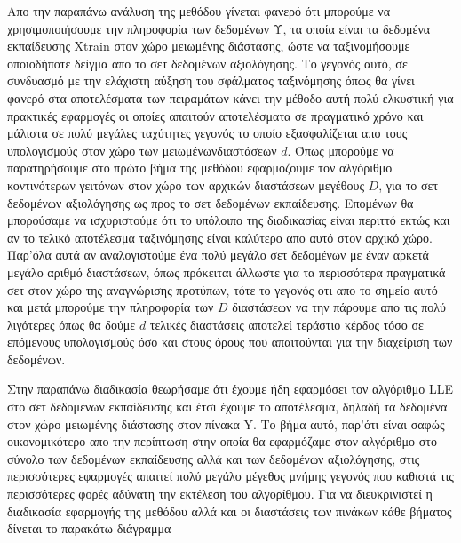 \par
Απο την παραπάνω ανάλυση της μεθόδου γίνεται φανερό ότι μπορούμε να χρησιμοποιήσουμε την πληροφορία των δεδομένων Υ, τα οποία είναι τα δεδομένα εκπαίδευσης \textlatin{Xtrain} στον χώρο μειωμένης διάστασης, ώστε να ταξινομήσουμε οποιοδήποτε δείγμα απο το σετ δεδομένων αξιολόγησης. Το γεγονός αυτό, σε συνδυασμό με την ελάχιστη αύξηση του σφάλματος ταξινόμησης όπως θα γίνει φανερό στα αποτελέσματα των πειραμάτων κάνει την μέθοδο αυτή πολύ ελκυστική για πρακτικές εφαρμογές οι οποίες απαιτούν αποτελέσματα σε πραγματικό χρόνο και μάλιστα σε πολύ μεγάλες ταχύτητες γεγονός το οποίο εξασφαλίζεται απο τους υπολογισμούς στον χώρο των μειωμένωνδιαστάσεων $d$. Όπως μπορούμε να παρατηρήσουμε στο πρώτο βήμα της μεθόδου εφαρμόζουμε τον αλγόριθμο κοντινότερων γειτόνων στον χώρο των αρχικών διαστάσεων μεγέθους $D$, για το σετ δεδομένων αξιολόγησης ως προς το σετ δεδομένων εκπαίδευσης. Επομένων θα μπορούσαμε να ισχυριστούμε ότι το υπόλοιπο της διαδικασίας είναι περιττό εκτώς και αν το τελικό αποτέλεσμα ταξινόμησης είναι καλύτερο απο αυτό στον αρχικό χώρο. Παρ'όλα αυτά αν αναλογιστούμε ένα πολύ μεγάλο σετ δεδομένων με έναν αρκετά μεγάλο αριθμό διαστάσεων, όπως πρόκειται άλλωστε για τα περισσότερα πραγματικά σετ στον χώρο της αναγνώρισης προτύπων, τότε το γεγονός οτι απο το σημείο αυτό και μετά μπορούμε την πληροφορία των $D$ διαστάσεων να την πάρουμε απο τις πολύ λιγότερες όπως θα δούμε $d$ τελικές διαστάσεις αποτελεί τεράστιο κέρδος τόσο σε επόμενους υπολογισμούς όσο και στους όρους που απαιτούνται για την διαχείριση των δεδομένων.  
\par
Στην παραπάνω διαδικασία θεωρήσαμε ότι έχουμε ήδη εφαρμόσει τον αλγόριθμο \textlatin{LLE} στο σετ δεδομένων εκπαίδευσης και έτσι έχουμε το αποτέλεσμα, δηλαδή τα δεδομένα στον χώρο μειωμένης διάστασης στον πίνακα \textlatin{Y}. Το βήμα αυτό, παρ'ότι είναι σαφώς οικονομικότερο απο την περίπτωση στην οποία θα εφαρμόζαμε στον αλγόριθμο στο σύνολο των δεδομένων εκπαίδευσης αλλά και των δεδομένων αξιολόγησης, στις περισσότερες εφαρμογές απαιτεί πολύ μεγάλο μέγεθος μνήμης γεγονός που καθιστά τις περισσότερες φορές αδύνατη την εκτέλεση του αλγορίθμου. Για να διευκρινιστεί η διαδικασία εφαρμογής της μεθόδου αλλά και οι διαστάσεις των πινάκων κάθε βήματος δίνεται το παρακάτω διάγραμμα  
\newpage
